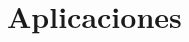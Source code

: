 \chapter{Aplicaciones}















































































